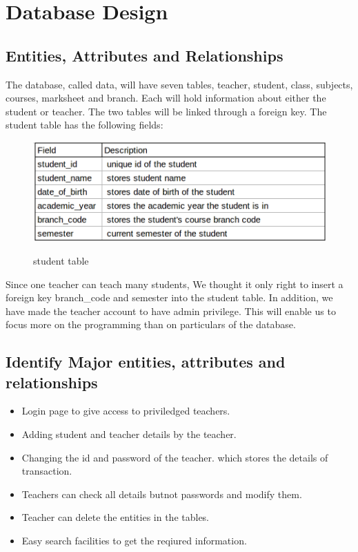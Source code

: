 \chapter{Database Design}

\section{Entities, Attributes and Relationships}
The database, called data, will have seven tables, teacher, student, class, subjects, courses, marksheet and branch. Each will hold information about either the student or teacher. The two
tables will be linked through a foreign key. The student table has the following fields:\\
\begin{figure}[H]
\centering
\caption{student table}
\includegraphics[scale=.5]{./StudentTable.png}
\\[0.2in]
\label{fig:Student Table}
\end{figure}
Since one teacher can teach many students, We thought it only right to insert a foreign key
branch\_code and semester into the student table. In addition, we have made the teacher account to have admin privilege. This will
enable us to focus more on the programming than on particulars of the database.\\
\pagebreak
\thispagestyle{fancy}
\section{Identify Major entities, attributes and relationships}
\begin{itemize}
\item Login page to give access to priviledged teachers.
\item Adding student and teacher details by the teacher.
\item Changing the id and password of the teacher.
which stores the details of transaction.
\item Teachers can check all details butnot passwords and modify them.
\item Teacher can delete the entities in the tables.
\item Easy  search facilities to get the reqiured information.
\end{itemize}

